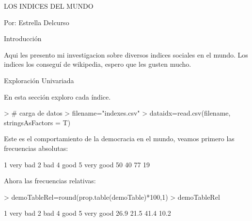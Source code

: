 \documentclass{article}
\begin{document}


LOS INDICES DEL MUNDO


Por: Estrella Delcurso


Introducción

Aqui les presento mi investigacion sobre diversos indices sociales en el mundo. Los indices los conseguí de wikipedia, espero que les gusten mucho.


Exploración Univariada

En esta sección exploro cada índice.




\begin{Schunk}
\begin{Sinput}
> # carga de datos
> filename="indexes.csv"
> dataidx=read.csv(filename, stringsAsFactors = T)
\end{Sinput}
\end{Schunk}


Este es el comportamiento de la democracia en el mundo, veamos primero las frecuencias absolutas:
\begin{Schunk}
\begin{Soutput}
 1 very bad       2 bad      4 good 5 very good 
         50          40          77          19 
\end{Soutput}
\end{Schunk}

Ahora las frecuencias relativas:
\begin{Schunk}
\begin{Sinput}
> demoTableRel=round(prop.table(demoTable)*100,1)
> demoTableRel
\end{Sinput}
\begin{Soutput}
 1 very bad       2 bad      4 good 5 very good 
       26.9        21.5        41.4        10.2 
\end{Soutput}
\end{Schunk}
\end{document}
